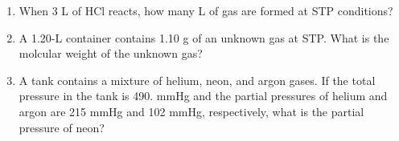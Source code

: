 \documentclass[main.tex]{subfiles}
\begin{document}
\begin{fullwidth}
\begin{multicols*}{2}
\begin{enumerate}
\item  When 3 L of HCl reacts, how many L of  gas are formed at STP conditions?
\begin{center}\end{center}
\begin{enumerate}[label=(\alph*)]\vspace{-0.5cm}
\end{enumerate}\vspace{-0.5cm}

\item  A 1.20-L container contains 1.10 g of an unknown gas at STP.  What is the molcular weight of the unknown gas?
\begin{enumerate}[label=(\alph*)]\vspace{-0.5cm}
\end{enumerate}\vspace{-0.5cm}



\item A tank contains a mixture of helium, neon, and argon gases.  If the total pressure in the tank is 490. mmHg and the partial pressures of helium and argon are 215 mmHg and 102 mmHg, respectively, what is the partial pressure of neon?
\begin{enumerate}[label=(\alph*)]\vspace{-0.5cm}
\end{enumerate}\vspace{-0.5cm}


\end{enumerate}
\end{multicols*}
\end{fullwidth}
\end{document}
